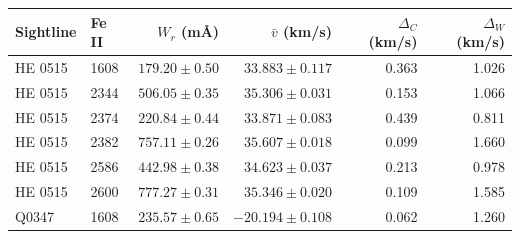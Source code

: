 \begin{tabular}{llrrrr}
\toprule
Sightline & Fe II & $W_r$ (m\AA) & $\bar v$ (km/s) & $\Delta_C$ (km/s) & $\Delta_W$ (km/s) \\
\midrule
HE 0515 & 1608 & $179.20\pm0.50$ & $33.883\pm0.117$ & 0.363 & 1.026 \\
HE 0515 & 2344 & $506.05\pm0.35$ & $35.306\pm0.031$ & 0.153 & 1.066 \\
HE 0515 & 2374 & $220.84\pm0.44$ & $33.871\pm0.083$ & 0.439 & 0.811 \\
HE 0515 & 2382 & $757.11\pm0.26$ & $35.607\pm0.018$ & 0.099 & 1.660 \\
HE 0515 & 2586 & $442.98\pm0.38$ & $34.623\pm0.037$ & 0.213 & 0.978 \\
HE 0515 & 2600 & $777.27\pm0.31$ & $35.346\pm0.020$ & 0.109 & 1.585 \\
Q0347 & 1608 & $235.57\pm0.65$ & $-20.194\pm0.108$ & 0.062 & 1.260 \\
\bottomrule
\end{tabular}
